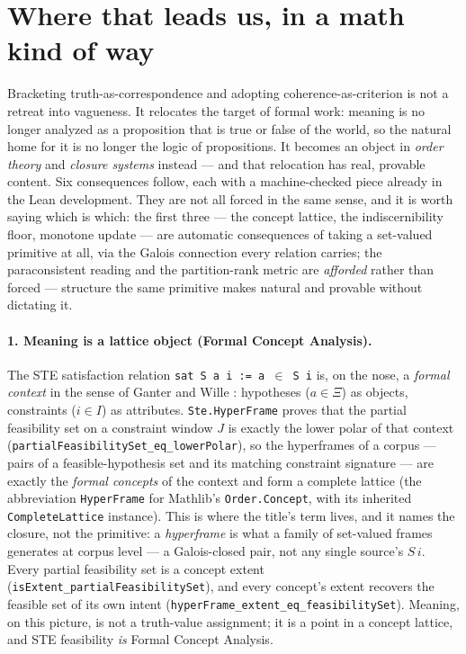 \documentclass[11pt]{article}
\newcommand{\code}[1]{\texttt{#1}}
\begin{document}
\section{Where that leads us, in a math kind of way}
\label{sec:math}

Bracketing truth-as-correspondence and adopting coherence-as-criterion
is not a retreat into vagueness. It relocates the target of formal
work: meaning is no longer analyzed as a proposition that is true or
false of the world, so the natural home for it is no longer the logic
of propositions. It becomes an object in \emph{order theory} and
\emph{closure systems} instead --- and that relocation has real,
provable content. Six consequences follow, each with a machine-checked
piece already in the Lean development. They are not all forced in the
same sense, and it is worth saying which is which: the first three ---
the concept lattice, the indiscernibility floor, monotone update ---
are automatic consequences of taking a set-valued primitive at all,
via the Galois connection every relation carries; the paraconsistent
reading and the partition-rank metric are \emph{afforded} rather than
forced --- structure the same primitive makes natural and provable
without dictating it.

\paragraph{1. Meaning is a lattice object (Formal Concept Analysis).}
The STE satisfaction relation \code{sat S a i := a \ensuremath{\in} S i} is, on
the nose, a \emph{formal context} in the sense of Ganter and Wille
\citep{ganter1999fca}: hypotheses ($a \in \Xi$) as objects, constraints
($i \in I$) as attributes. \code{Ste.HyperFrame} proves that the
partial feasibility set on a constraint window $J$ is
exactly the lower polar of that context
(\code{partialFeasibilitySet\_eq\_lowerPolar}), so the hyperframes of a
corpus --- pairs of a feasible-hypothesis set and its matching
constraint signature --- are exactly the \emph{formal concepts} of the
context and form a complete lattice (the abbreviation \code{HyperFrame}
for Mathlib's \code{Order.Concept}, with its inherited
\code{CompleteLattice} instance). This is where the title's term
lives, and it names the closure, not the primitive: a
\emph{hyperframe} is what a family of set-valued frames generates at
corpus level --- a Galois-closed pair, not any single source's
$S\,i$. Every partial feasibility set is a
concept extent (\code{isExtent\_partialFeasibilitySet}), and every
concept's extent recovers the feasible set of its own intent
(\code{hyperFrame\_extent\_eq\_feasibilitySet}). Meaning, on this
picture, is not a truth-value assignment; it is a point in a concept
lattice, and STE feasibility \emph{is} Formal Concept Analysis.
\end{document}
